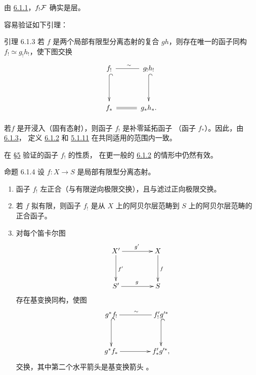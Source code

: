 由 \hyperref[XVII.prop6.1.1]{6.1.1}，$f_{!}{\mathcal F} $ 确实是层。

容易验证如下引理：

\begin{enonce*}{引理 6.1.3}
若 $f$ 是两个局部有限型分离态射的复合 $gh$，则存在唯一的函子同构
$f_{!}\simeq g_{!}h_{!}$，使下图交换
$$
\xymatrix@C=1cm@R=1.25cm@M=.2cm{
f_{!}  \ar@{-}[r]^{\sim} \ar@{^{(}->}[d]& g_{!}h_{!} \ar@{^{(}->}[d]\\
f_{\ast} \ar@{=}[r]      & g_{\ast} h_{\ast}.
}
$$
\end{enonce*}

若\pageoriginale $f$ 是开浸入（\resp 固有态射），则函子 $f_{!}$ 是补零延拓函子
（\resp 函子 $f_{\ast}$）。因此，由 \hyperref[XVII.lem6.1.3]{6.1.3}，
定义 \hyperref[XVII.def6.1.2]{6.1.2} 和 \hyperref[XVII.var5.1.11]{5.1.11}
在共同适用的范围内一致。

在 \hyperref[XVII.sec5]{\S 5} 验证的函子 $f_{!}$ 的性质，
在更一般的 \hyperref[XVII.def6.1.2]{6.1.2} 的情形中仍然有效。

\begin{enonce*}{命题 6.1.4}
设 $f:X\rightarrow S$ 是局部有限型分离态射。
\begin{enumerate}
\renewcommand{\theenumi}{\roman{enumi}}
\renewcommand{\labelenumi}{(\theenumi)}
\item 函子 $f_{!}$ 左正合（\ie 与有限逆向极限交换），且与滤过正向极限交换。

\item 若 $f$ 拟有限，则函子 $f_{!}$ 是从 $X$ 上的阿贝尔层范畴到
$S$ 上的阿贝尔层范畴的正合函子。

\item 对每个笛卡尔图
$$
\xymatrix@C=1.5cm@R=1.25cm{
X'          \ar[r]^{g'} \ar[d]^{f'}& X \ar[d]^{f}\\
S'          \ar[r]^{g}  & S
}
$$
存在基变换同构，使图
$$
\xymatrix@C=1.5cm@R=1.25cm{
g^{\ast}f_{!}  \sisi{\ar@{=}[r]}{\ar@{-}[r]^\sim} \ar@{^{(}->}[d]& f'_{!}g'^{\ast}\ar@{^{(}->}[d]\\
g^{\ast}f_{\ast}  \ar[r]    & f'_{\ast}g'^{\ast},
}
$$
交换，其中第二个水平箭头是基变换箭头
\emph{}。
\end{enumerate}
\end{enonce*}

